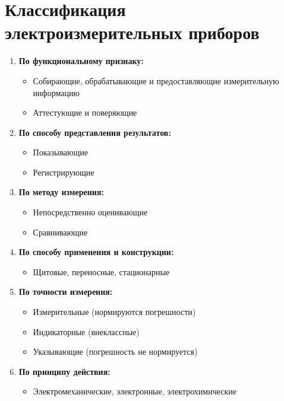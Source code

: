 \documentclass[14pt, a4paper, twoside]{extreport}
\begin{document}
\section{Классификация электроизмерительных приборов}
\begin{enumerate}
  \item \textbf{По функциональному признаку:}
    \begin{itemize}
      \item Собирающие, обрабатывающие и предоставляющие измерительную информацию
      \item Аттестующие и поверяющие
    \end{itemize}

  \item \textbf{По способу представления результатов:}
    \begin{itemize}
      \item Показывающие
      \item Регистрирующие
    \end{itemize}

  \item \textbf{По методу измерения:}
    \begin{itemize}
      \item Непосредственно оценивающие
      \item Сравнивающие
    \end{itemize}

  \item \textbf{По способу применения и конструкции:}
    \begin{itemize}
      \item Щитовые, переносные, стационарные
    \end{itemize}

  \item \textbf{По точности измерения:}
    \begin{itemize}
      \item Измерительные (нормируются погрешности)
      \item Индикаторные (внеклассные)
      \item Указывающие (погрешность не нормируется)
    \end{itemize}

  \item \textbf{По принципу действия:}
    \begin{itemize}
      \item Электромеханические, электронные, электрохимические
    \end{itemize}
\end{enumerate}
\end{document}
